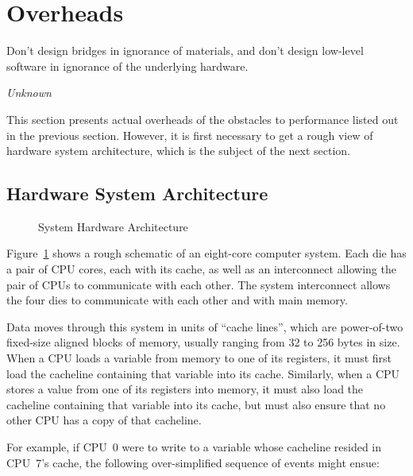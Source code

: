 
\section{Overheads}
\label{sec:cpu:Overheads}
%
\epigraph{Don't design bridges in ignorance of materials, and don't design
	  low-level software in ignorance of the underlying hardware.}
	 {\emph{Unknown}}

This section presents actual overheads of the obstacles to performance
listed out in the previous section.
However, it is first necessary to get a rough view of hardware system
architecture, which is the subject of the next section.

\subsection{Hardware System Architecture}
\label{sec:cpu:Hardware System Architecture}

\begin{figure}
\centering
{}
\caption{System Hardware Architecture}
\label{fig:cpu:System Hardware Architecture}
\end{figure}

Figure~\ref{fig:cpu:System Hardware Architecture}
shows a rough schematic of an eight-core computer system.
Each die has a pair of CPU cores, each with its cache, as well as an
interconnect allowing the pair of CPUs to communicate with each other.
The system interconnect allows the four dies to communicate with each
other and with main memory.

Data moves through this system in units of ``cache lines'', which
are power-of-two fixed-size aligned blocks of memory, usually ranging
from 32 to 256 bytes in size.
When a CPU loads a variable from memory to one of its registers, it must
first load the cacheline containing that variable into its cache.
Similarly, when a CPU stores a value from one of its registers into
memory, it must also load the cacheline containing that variable into
its cache, but must also ensure that no other CPU has a copy of that
cacheline.

For example, if CPU~0 were to write to a variable whose cacheline
resided in CPU~7's cache, the following over-simplified sequence of
events might ensue:

